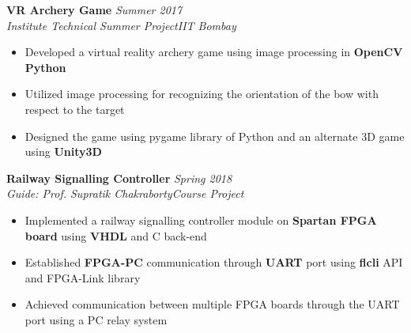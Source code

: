 \documentclass{article}
\begin{document}
\vspace{-2pt}
\textbf{VR Archery Game} \hfill{\sl \small Summer 2017}\\
\textit{Institute Technical Summer Project}\hfill{\sl \small IIT Bombay}\\
\vspace{-15pt}
\begin{itemize}[itemsep = -0.75 mm, leftmargin=*]
\item Developed a virtual reality archery game using image processing in \textbf{OpenCV Python}
\item Utilized image processing for recognizing the orientation of the bow with respect to the target
\item Designed the game using pygame library of Python and an alternate 3D game using \textbf{Unity3D}
\end{itemize}
\pagebreak
\vspace*{20pt}
\textbf{Railway Signalling Controller} \hfill{\sl \small Spring 2018}\\
\textit{Guide: Prof. Supratik Chakraborty}\hfill{\sl \small Course Project}\\
\vspace{-16pt}
\begin{itemize}[itemsep = -0.75 mm, leftmargin=*]
\item Implemented a railway signalling controller module on \textbf{Spartan FPGA board} using \textbf{VHDL} and C back-end
\item Established \textbf{FPGA-PC} communication through \textbf{UART} port using \textbf{flcli} API and FPGA-Link library
\item Achieved communication between multiple FPGA boards through the UART port using a PC relay system
\end{itemize}
\end{document}
